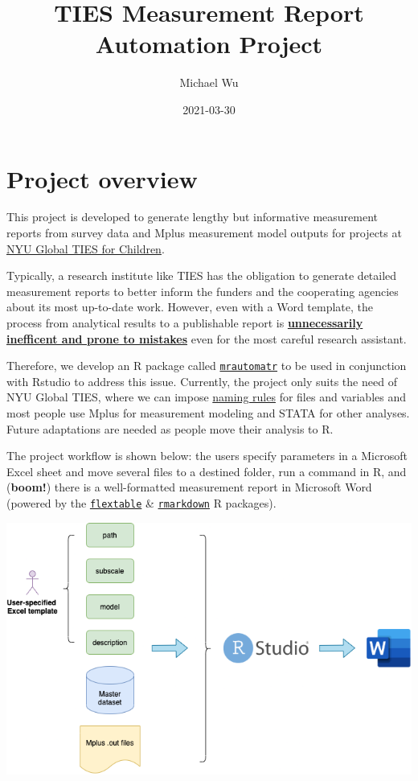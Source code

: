 \documentclass[
]{book}
\title{TIES Measurement Report Automation Project}
\author{Michael Wu}
\date{2021-03-30}
\begin{document}
\maketitle

{
\setcounter{tocdepth}{1}
\tableofcontents
}
\hypertarget{project-overview}{%
\chapter{Project overview}\label{project-overview}}

This project is developed to generate lengthy but informative measurement reports from survey data and Mplus measurement model outputs for projects at \href{https://steinhardt.nyu.edu/ihdsc/global-ties}{NYU Global TIES for Children}.

Typically, a research institute like TIES has the obligation to generate detailed measurement reports to better inform the funders and the cooperating agencies about its most up-to-date work. However, even with a Word template, the process from analytical results to a publishable report is \underline{\textbf{unnecessarily inefficent and prone to mistakes}} even for the most careful research assistant.

Therefore, we develop an R package called \href{https://github.com/nyuglobalties/mrautomatr}{\texttt{mrautomatr}} to be used in conjunction with Rstudio to address this issue. Currently, the project only suits the need of NYU Global TIES, where we can impose \href{https://nyu.box.com/s/ate5l7wmw164u7xjg3g8x1vrfhwnt0ax}{naming rules} for files and variables and most people use Mplus for measurement modeling and STATA for other analyses. Future adaptations are needed as people move their analysis to R.

The project workflow is shown below: the users specify parameters in a Microsoft Excel sheet and move several files to a destined folder, run a command in R, and (\textbf{boom!}) there is a well-formatted measurement report in Microsoft Word (powered by the \href{https://davidgohel.github.io/flextable/}{\texttt{flextable}} \& \href{https://bookdown.org/yihui/rmarkdown/}{\texttt{rmarkdown}} R packages).

\begin{center}\includegraphics[width=0.66\linewidth]{images/mrautomatr_diagram} \end{center}
\end{document}

